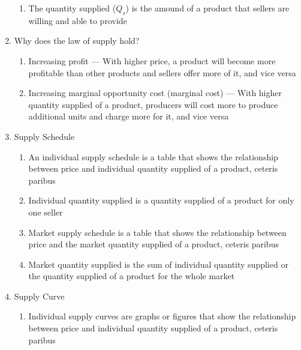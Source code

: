 \documentclass[12pt]{article}
\begin{document}
\begin{enumerate}
\begin{enumerate}
          \item The quantity supplied ($Q_s$) is the amound of a product that sellers are willing and able to provide

        \end{enumerate}

      \item Why does the law of supply hold?

        \begin{enumerate}

          \item Increasing profit — With higher price, a product will become more profitable than other products and sellers offer more of it, and vice versa

          \item Increasing marginal opportunity cost (marginal cost) — With higher quantity supplied of a product, producers will cost more to produce additional units and charge more for it, and vice versa

        \end{enumerate}

      \item Supply Schedule

        \begin{enumerate}

          \item An individual supply schedule is a table that shows the relationship between price and individual quantity supplied of a product, ceteris paribus

          \item Individual quantity supplied is a quantity supplied of a product for only one seller

          \item Market supply schedule is a table that shows the relationship between price and the market quantity supplied of a product, ceteris paribus

          \item Market quantity supplied is the sum of individual quantity supplied or the quantity supplied of a product for the whole market

        \end{enumerate}

      \item Supply Curve

        \begin{enumerate}

          \item Individual supply curves are graphs or figures that show the relationship between price and individual quantity supplied of a product, ceteris paribus


\end{enumerate}
\end{enumerate}
\end{document}
